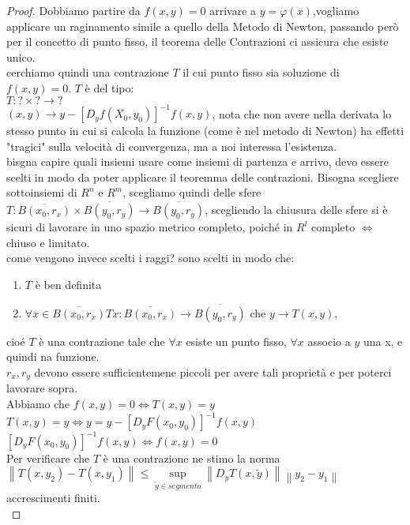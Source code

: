 \begin{proof}
	Dobbiamo partire da $f(x,y)=0$ arrivare a $y=\varphi(x)$,vogliamo applicare un raginamento simile a quello della Metodo di Newton, passando però per il concetto di punto fisso, il teorema delle Contrazioni ci assicura che esiste unico.\\
	cerchiamo quindi una contrazione $T$ il cui punto fisso sia soluzione di $f(x,y)=0$. $T$ è del tipo:\\
	$T:?\times ?\rightarrow ?$\\
	$(x,y)\rightarrow y-[D_yf(X_0,y_0)]^{-1}f(x,y)$, nota che non avere nella derivata lo stesso punto in cui si calcola la funzione (come è nel metodo di Newton) ha effetti "tragici" sulla velocità di convergenza, ma a noi interessa l'esistenza.\\
	bisgna capire quali insiemi usare come insiemi di partenza e arrivo, devo essere scelti in modo da poter applicare il teoremma delle contrazioni. Bisogna scegliere sottoinsiemi di $R^n$ e $R^m$, scegliamo quindi delle sfere\\
	$T:\overline{B(x_0,r_x)}\times\overline{B(y_0,r_y)}\rightarrow\overline{B(y_0,r_y)}$, scegliendo la chiusura delle sfere si è sicuri di lavorare in uno spazio metrico completo, poiché in $R^l$ completo $\Leftrightarrow$ chiuso e limitato.\\
	come vengono invece scelti i raggi? sono scelti in modo che:\\
	\begin{enumerate}
		\item $T$ è ben definita
		\item $\forall x \in \overline{B(x_0,r_x)} Tx: \overline{B(x_0,r_x)}\rightarrow\overline{B(y_0,r_y)}$ che $y\rightarrow T(x,y)$,\\
	\end{enumerate}
	cio\'e $T$ è una contrazione tale che $\forall x$ esiste un punto fisso, $\forall x$ associo a $y$ una x, e quindi na funzione.\\
	$r_x,r_y$ devono essere sufficientemene piccoli per avere tali proprietà e per poterci lavorare sopra.\\
	Abbiamo che $f(x,y)=0 \Leftrightarrow T(x,y)=y$\\
	$T(x,y)=y\Leftrightarrow y=y-[D_yF(x_0,y_0)]^{-1}f(x,y)$\\
	$[D_yF(x_0,y_0)]^{-1}f(x,y)\Leftrightarrow f(x,y)=0$\\
	Per verificare che $T$ è una contrazione ne stimo la norma\\
	$\left\| T(x,y_2)-T(x,y_1) \right\| \le \sup\limits_{\widetilde{y}\in segmento}\left\| D_yT(x,\widetilde{y})\right\|\left\| y_2-y_1 \right\| $  accrescimenti finiti.\\

\end{proof}
